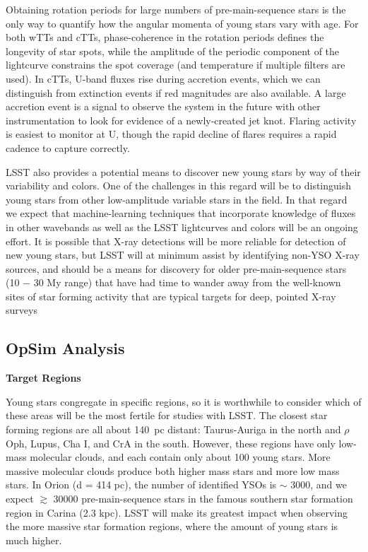 Obtaining rotation periods for large numbers of pre-main-sequence stars is the only way to
quantify how the angular momenta of young stars vary with age. For both wTTs and cTTs,
phase-coherence in the rotation periods defines the longevity of star spots, while the 
amplitude of the periodic component of the lightcurve constrains the spot coverage (and
temperature if multiple filters are used). In cTTs, U-band fluxes rise during
accretion events, which we can distinguish from extinction events if red magnitudes are
also available. A large accretion event is a signal to observe the system
in the future with other instrumentation to look for evidence of a newly-created
jet knot. Flaring activity is easiest to monitor at U, though the rapid decline of
flares requires a rapid cadence to capture correctly.

LSST also provides a potential means to discover new young stars by way of
their variability and colors. One of the challenges in this regard will be to
distinguish young stars from other low-amplitude variable stars in the field.
In that regard we expect that machine-learning techniques that incorporate knowledge of
fluxes in other wavebands as well as the LSST lightcurves and colors will
be an ongoing effort. It is possible that X-ray detections will be more
reliable for detection of new young stars, but LSST will at minimum assist
by identifying non-YSO X-ray sources, and should be a means for discovery
for older pre-main-sequence stars (10 $-$ 30 My range) that have had time
to wander away from the well-known sites of star forming activity that are
typical targets for deep, pointed X-ray surveys


\subsection{OpSim Analysis}
\label{sec:\secname:analysis}

\bf{ Target Regions}

Young stars congregate in specific regions, so it is worthwhile to
consider which of these areas will be the most fertile for studies with LSST.  
The closest star forming regions are all about 140~pc distant: Taurus-Auriga in
the north and $\rho$ Oph, Lupus, Cha I, and CrA in the south. However,
these regions have only low-mass molecular clouds, and each contain
only about 100 young stars. More massive molecular clouds produce both higher
mass stars and more low mass stars. In Orion (d = 414 pc), the number of
identified YSOs is $\sim$ 3000, and we expect $\gtrsim$ 30000 pre-main-sequence
stars in the famous southern star formation region in Carina (2.3 kpc).
LSST will make its greatest impact
when observing the more massive star formation regions, where the amount
of young stars is much higher.

